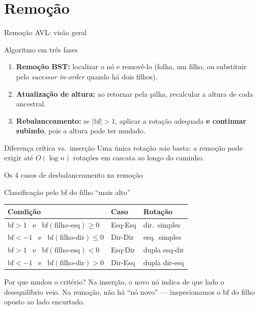 \documentclass[aspectratio=169]{beamer}
\begin{document}
\section{Remoção}

\begin{frame}{Remoção AVL: visão geral}
  \begin{block}{Algoritmo em três fases}
    \begin{enumerate}
      \item \textbf{Remoção BST:} localizar o nó e removê-lo
            (folha, um filho, ou substituir pelo \emph{sucessor in-order}
            quando há dois filhos).
      \item \textbf{Atualização de altura:} ao retornar pela pilha,
            recalcular a altura de cada ancestral.
      \item \textbf{Rebalanceamento:} se $|\mathrm{bf}| > 1$, aplicar
            a rotação adequada \textbf{e continuar subindo},
            pois a altura pode ter mudado.
    \end{enumerate}
  \end{block}
  \begin{alertblock}{Diferença crítica vs.\ inserção}
    Uma única rotação \emph{não} basta: a remoção pode exigir
    até $O(\log n)$ rotações em cascata ao longo do caminho.
  \end{alertblock}
\end{frame}

\begin{frame}{Os 4 casos de desbalanceamento na remoção}
  \begin{block}{Classificação pelo $\mathrm{bf}$ do filho ``mais alto''}
  \centering
  \begin{tabular}{lll}
    \toprule
    Condição & Caso & Rotação \\
    \midrule
    $\mathrm{bf}>1$ \ e \ $\mathrm{bf}(\text{filho-esq})\ge 0$  & Esq-Esq & dir.\ simples \\
    $\mathrm{bf}<-1$ \ e \ $\mathrm{bf}(\text{filho-dir})\le 0$ & Dir-Dir & esq.\ simples \\
    $\mathrm{bf}>1$ \ e \ $\mathrm{bf}(\text{filho-esq}) < 0$   & Esq-Dir & dupla esq-dir \\
    $\mathrm{bf}<-1$ \ e \ $\mathrm{bf}(\text{filho-dir}) > 0$  & Dir-Esq & dupla dir-esq \\
    \bottomrule
  \end{tabular}
  \end{block}
  \begin{exampleblock}{Por que mudou o critério?}
    Na inserção, o novo nó indica de que lado o desequilíbrio veio.
    Na remoção, não há ``nó novo'' --- inspecionamos o
    $\mathrm{bf}$ do filho oposto ao lado encurtado.
  \end{exampleblock}
\end{frame}
\end{document}
